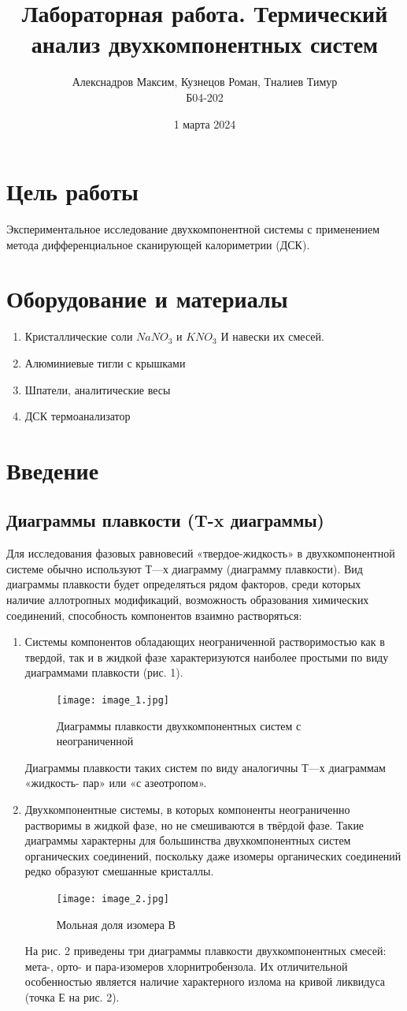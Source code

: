 \documentclass[a4paper,12pt]{article} %
\title{\textbf{Лабораторная работа. Термический анализ двухкомпонентных систем} }
\author{Алекснадров Максим, Кузнецов Роман, Тналиев Тимур \\ Б04-202}
\date{1 марта 2024}
\begin{document}
\maketitle

\section{Цель работы}
Экспериментальное исследование двухкомпонентной системы с применением метода дифференциальное сканирующей калориметрии (ДСК).
\section{Оборудование и материалы}
\begin{enumerate}
    \item Кристаллические соли $NaNO_3$ и $KNO_3$ И навески их смесей.
    \item Алюминиевые тигли с крышками
    \item Шпатели, аналитические весы
    \item ДСК термоанализатор
\end{enumerate}
\section{Введение}
\subsection{Диаграммы плавкости (T-x диаграммы)}
Для исследования фазовых равновесий «твердое-жидкость» в двухкомпонентной системе обычно используют Т—х диаграмму (диаграмму 
плавкости). Вид диаграммы плавкости будет определяться рядом факторов, 
среди которых наличие аллотропных модификаций, возможность 
образования химических соединений, способность компонентов взаимно 
растворяться: 
\begin{enumerate}
    \item Системы компонентов обладающих неограниченной растворимостью как 
в твердой, так и в жидкой фазе характеризуются наиболее простыми по 
виду диаграммами плавкости (рис. 1). 
\newpage
\begin{figure}[H]
    \centering
    \texttt{[image: image\_1.jpg]}
    \caption{Диаграммы плавкости двухкомпонентных систем с неограниченной}
\end{figure}
Диаграммы плавкости таких систем по виду аналогичны Т—х диаграммам 
«жидкость- пар» или «с азеотропом». 
\item Двухкомпонентные 
системы, в которых компоненты неограниченно растворимы в жидкой 
фазе, но не смешиваются в твёрдой фазе. Такие диаграммы характерны 
для большинства двухкомпонентных систем органических соединений, 
поскольку даже изомеры органических соединений редко образуют 
смешанные кристаллы. 
\begin{figure}[H]
    \centering
    \texttt{[image: image\_2.jpg]}
    \caption{Мольная доля изомера $В$}
\end{figure}
На рис. 2 приведены три диаграммы плавкости двухкомпонентных смесей: мета-, орто- и пара-изомеров хлорнитробензола. Их отличительной 
особенностью является наличие характерного излома на кривой ликвидуса 
(точка Е на рис. 2). 

\end{enumerate}
\end{document}
